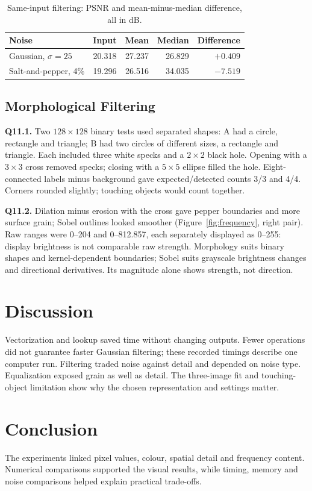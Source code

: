 \documentclass[10pt,a4paper]{article}
\begin{document}
\begin{table}[H]
\centering\small
\caption{Same-input filtering: PSNR and mean-minus-median difference, all in dB.}
\label{tab:noise}
\begin{tabular}{lrrrr}\toprule
Noise & Input & Mean & Median & Difference\\\midrule
Gaussian, \(\sigma=25\) & 20.318 & 27.237 & 26.829 & \(+0.409\)\\
Salt-and-pepper, 4\% & 19.296 & 26.516 & 34.035 & \(-7.519\)\\\bottomrule
\end{tabular}
\end{table}

\subsection{Morphological Filtering}
\textbf{Q11.1.} Two \(128\times128\) binary tests used separated shapes:
A had a circle, rectangle and triangle; B had two circles of different sizes,
a rectangle and triangle. Each included three white specks and a \(2\times2\)
black hole. Opening with a \(3\times3\) cross removed specks; closing with a
\(5\times5\) ellipse filled the hole. Eight-connected labels minus background
gave expected/detected counts 3/3 and 4/4. Corners rounded slightly; touching
objects would count together.

\textbf{Q11.2.} Dilation minus erosion with the cross gave pepper boundaries
and more surface grain; Sobel outlines looked smoother (Figure~\ref{fig:frequency}, right pair).
Raw ranges were 0--204 and 0--812.857, each separately displayed as 0--255:
display brightness is not comparable raw strength. Morphology suits binary
shapes and kernel-dependent boundaries; Sobel suits grayscale brightness changes
and directional derivatives. Its magnitude alone shows strength, not direction.

\section{Discussion}
Vectorization and lookup saved time without changing outputs. Fewer operations
did not guarantee faster Gaussian filtering; these recorded timings describe
one computer run. Filtering traded noise against detail and depended on noise
type. Equalization exposed grain as well as detail. The three-image fit and
touching-object limitation show why the chosen representation and settings matter.

\section{Conclusion}
The experiments linked pixel values, colour, spatial detail and frequency content.
Numerical comparisons supported the visual results, while timing, memory and
noise comparisons helped explain practical trade-offs.
\end{document}
